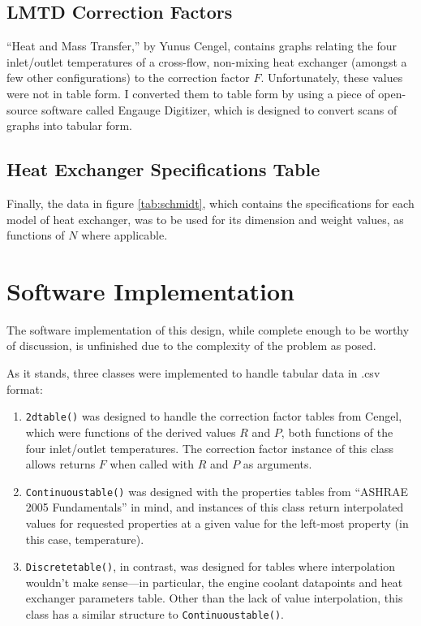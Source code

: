 \documentclass[12pt,letterpaper]{article}
\begin{document}
\subsection{LMTD Correction Factors}

``Heat and Mass Transfer,'' by Yunus Cengel, contains graphs relating the four inlet/outlet temperatures of a cross-flow, non-mixing heat exchanger (amongst a few other configurations) to the correction factor \(F\). Unfortunately, these values were not in table form. I converted them to table form by using a piece of open-source software called Engauge Digitizer, which is designed to convert scans of graphs into tabular form.

\subsection{Heat Exchanger Specifications Table}

Finally, the data in figure \ref{tab:schmidt}, which contains the specifications for each model of heat exchanger, was to be used for its dimension and weight values, as functions of \(N\) where applicable.

\section{Software Implementation}

The software implementation of this design, while complete enough to be worthy of discussion, is unfinished due to the complexity of the problem as posed.

As it stands, three classes were implemented to handle tabular data in .csv format:

\begin{enumerate}
\item \texttt{2dtable()} was designed to handle the correction factor tables from Cengel, which were functions of the derived values \(R\) and \(P\), both functions of the four inlet/outlet temperatures. The correction factor instance of this class allows returns \(F\) when called with \(R\) and \(P\) as arguments.
\item \texttt{Continuoustable()} was designed with the properties tables from ``ASHRAE 2005 Fundamentals'' in mind, and instances of this class return interpolated values for requested properties at a given value for the left-most property (in this case, temperature).
\item \texttt{Discretetable()}, in contrast, was designed for tables where interpolation wouldn't make sense---in particular, the engine coolant datapoints and heat exchanger parameters table. Other than the lack of value interpolation, this class has a similar structure to \texttt{Continuoustable()}.
\end{enumerate}
\end{document}
